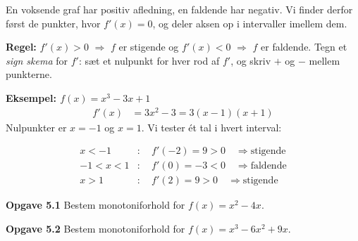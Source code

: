 \documentclass[11pt,a4paper]{article}
\begin{document}
\noindent
En voksende graf har positiv afledning, en faldende har negativ. Vi
finder derfor først de punkter, hvor $f'(x) = 0$, og deler aksen op i
intervaller imellem dem.

\begin{regelbox}
\textbf{Regel:} \quad
$f'(x) > 0$ \quad$\Rightarrow$ \quad $f$ er stigende \qquad og \qquad
$f'(x) < 0$ \quad$\Rightarrow$ \quad $f$ er faldende.
Tegn et \emph{sign skema} for $f'$: sæt et nulpunkt for hver rod af $f'$,
og skriv $+$ og $-$ mellem punkterne.
\end{regelbox}

\textbf{Eksempel: $f(x) = x^{3} - 3x + 1$}
\begin{align*}
  f'(x) &= 3x^{2} - 3 = 3(x-1)(x+1)
\end{align*}
Nulpunkter er $x = -1$ og $x = 1$. Vi tester ét tal i hvert interval:

\begin{center}
\end{center}

\begin{align*}
  x < -1 &: \quad f'(-2) = 9 > 0 \quad\Rightarrow \text{stigende}\\
  -1 < x < 1 &: \quad f'(0) = -3 < 0 \quad\Rightarrow \text{faldende}\\
  x > 1 &: \quad f'(2) = 9 > 0 \quad\Rightarrow \text{stigende}
\end{align*}

\begin{opgavebox}
\textbf{Opgave 5.1} \quad Bestem monotoniforhold for $f(x) = x^{2} - 4x$.
\end{opgavebox}

\begin{opgavebox}
\textbf{Opgave 5.2} \quad Bestem monotoniforhold for
$f(x) = x^{3} - 6x^{2} + 9x$.
\end{opgavebox}
\end{document}
